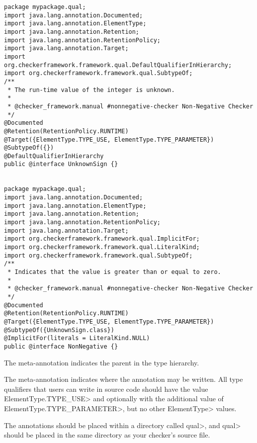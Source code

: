 \begin{Verbatim}
package mypackage.qual;
import java.lang.annotation.Documented;
import java.lang.annotation.ElementType;
import java.lang.annotation.Retention;
import java.lang.annotation.RetentionPolicy;
import java.lang.annotation.Target;
import org.checkerframework.framework.qual.DefaultQualifierInHierarchy;
import org.checkerframework.framework.qual.SubtypeOf;
/**
 * The run-time value of the integer is unknown.
 *
 * @checker_framework.manual #nonnegative-checker Non-Negative Checker
 */
@Documented
@Retention(RetentionPolicy.RUNTIME)
@Target({ElementType.TYPE_USE, ElementType.TYPE_PARAMETER})
@SubtypeOf({})
@DefaultQualifierInHierarchy
public @interface UnknownSign {}


package mypackage.qual;
import java.lang.annotation.Documented;
import java.lang.annotation.ElementType;
import java.lang.annotation.Retention;
import java.lang.annotation.RetentionPolicy;
import java.lang.annotation.Target;
import org.checkerframework.framework.qual.ImplicitFor;
import org.checkerframework.framework.qual.LiteralKind;
import org.checkerframework.framework.qual.SubtypeOf;
/**
 * Indicates that the value is greater than or equal to zero.
 *
 * @checker_framework.manual #nonnegative-checker Non-Negative Checker
 */
@Documented
@Retention(RetentionPolicy.RUNTIME)
@Target({ElementType.TYPE_USE, ElementType.TYPE_PARAMETER})
@SubtypeOf({UnknownSign.class})
@ImplicitFor(literals = LiteralKind.NULL)
public @interface NonNegative {}
\end{Verbatim}

The  meta-annotation
indicates the parent in the type hierarchy.

The 
meta-annotation indicates where the annotation
may be written. All type qualifiers that users can write in source code should
have the value \<ElementType.TYPE\_USE> and optionally with the additional value
of \<ElementType.TYPE\_PARAMETER>, but no other \<ElementType> values.

The annotations should be placed within a directory called \<qual>, and
\<qual> should be placed in the same directory as your checker's source file.

